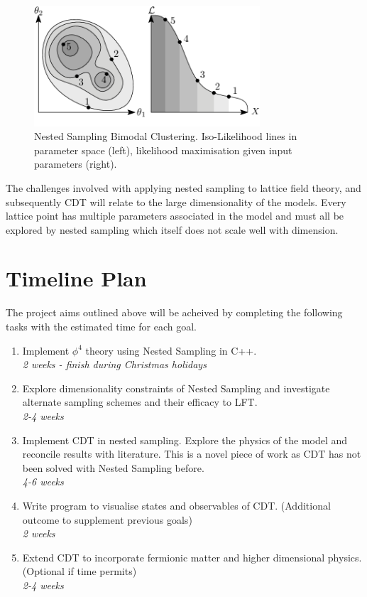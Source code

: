 \documentclass[a4paper]{article}
\begin{document}
\begin{figure}[H]
\centering
\includegraphics[width=0.75\textwidth]{ns}
\caption{Nested Sampling Bimodal Clustering. Iso-Likelihood lines in
  parameter space (left), likelihood maximisation given input
  parameters (right).}
\end{figure}

The challenges involved with applying nested sampling to lattice field theory, and
subsequently CDT will relate to the large dimensionality of the
models. Every lattice point has multiple parameters associated in the
model and must all be explored by nested sampling which itself does
not scale well with dimension.


\section{Timeline Plan}
The project aims outlined above will be acheived by completing the
following tasks with the estimated time for each goal.

\begin{enumerate}
\item Implement $\phi^4$ theory using Nested Sampling in C++. \\
  {\it 2 weeks - finish during Christmas holidays}
\item Explore dimensionality constraints of Nested Sampling and
  investigate alternate sampling schemes and their efficacy to LFT. \\
  {\it 2-4 weeks}
\item Implement CDT in nested sampling. Explore the physics of the
  model and reconcile results with literature. This is a novel piece
  of work as CDT has not been solved with Nested Sampling before. \\
  {\it 4-6 weeks}
\item Write program to visualise states and observables of
  CDT. (Additional outcome to supplement previous goals) \\
  {\it 2 weeks}
\item Extend CDT to incorporate fermionic matter and higher
  dimensional physics. (Optional if time permits) \\
  {\it 2-4 weeks}
\end{enumerate}
\end{document}
